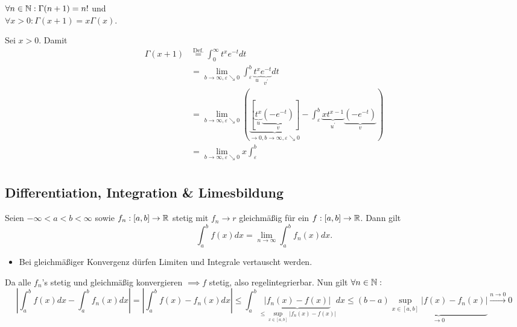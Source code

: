 \begin{subtheorem}
	$ \forall n \in \mathbb{N} : \Gamma(n + 1) = n! $ und\\
	$ \forall x > 0 : \Gamma(x + 1) = x \Gamma(x) $.
\end{subtheorem}

\begin{subproof*}
	Sei $  x > 0 $. Damit
	\begin{align*}
		\Gamma(x+1) &\overset{\text{Def.} }{=} \int_{0}^{\infty} t ^{x} e^{-t} dt \\
		~&= \lim_{b \to \infty, \varepsilon \searrow 0} \int_{\varepsilon }^{b} \underbrace{t ^{x} }_{u} \underbrace{e^{-t} }_{v^\prime}dt  \\
		~&= \lim_{b \to \infty, \varepsilon \searrow 0} \left( \underbrace{\left[ \underbrace{t ^{x} }_{u} \underbrace{\left( -e^{-t}  \right) }_{v} \right] }_{\to 0, b \to \infty, \varepsilon \searrow 0} - \int_{\varepsilon }^{b} \underbrace{x t ^{x-1} }_{u^\prime} \underbrace{\left( - e^{-t}  \right) }_{v} \right)  \\
		~&= \lim_{b \to \infty, \varepsilon \searrow 0} x \int_{\varepsilon }^{b} \\
	\end{align*}
	
\end{subproof*}

\subsection{Differentiation, Integration \& Limesbildung}
\begin{subtheorem}
	Seien $ -\infty < a < b < \infty $ sowie $ f_n : [a, b] \to \mathbb{R}  $ stetig mit $ f_n \to r $ gleichmäßig für ein $ f: [a, b] \to \mathbb{R}  $. Dann gilt
	\[
		\int_{a}^{b}f(x) dx = \lim_{n \to \infty} \int_{a}^{b} f_n (x) dx.
	\]
	\begin{itemize}
		\item Bei gleichmäßiger Konvergenz dürfen Limiten und Integrale vertauscht werden.
	\end{itemize}
\end{subtheorem}

\begin{subproof*}
	Da alle $ f_n $'s stetig und gleichmäßig konvergieren $ \implies f $ stetig, also regelintegrierbar. Nun gilt $ \forall n \in \mathbb{N} : $ 
	\[
		\left| \int_{a}^{b} f(x) dx - \int_{a}^{b} f_n(x) dx \right| = \left| \int_{a}^{b} f(x) - f_n(x) dx \right| \leq \int_{a}^{b} \underbrace{\left| f_n (x) - f(x) \right| }_{\leq \sup_{x \in [a, b]} \left| f_n(x) - f(x) \right| } dx \leq  ( b - a ) \underbrace{\sup_{x \in  [a, b]} \left| f(x) - f_n(x) \right|  }_{\to 0} \overset{n \to 0}{\to } 0
	\]
\end{subproof*}

